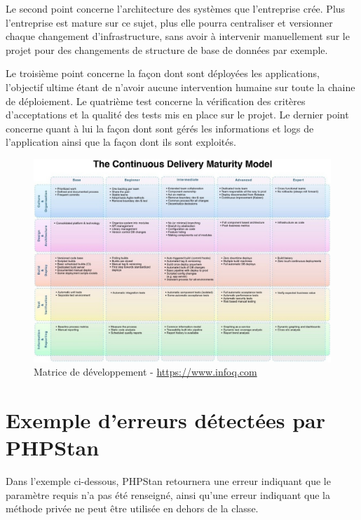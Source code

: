 Le second point concerne l'architecture des systèmes que l'entreprise crée. Plus l'entreprise est mature sur ce sujet, plus elle pourra centraliser et versionner chaque changement d'infrastructure, sans avoir à intervenir manuellement sur le projet pour des changements de structure de base de données par exemple.

Le troisième point concerne la façon dont sont déployées les applications, l'objectif ultime étant de n'avoir aucune intervention humaine sur toute la chaine de déploiement. Le quatrième test concerne la vérification des critères d'acceptations et la qualité des tests mis en place sur le projet. Le dernier point concerne quant à lui la façon dont sont gérés les informations et logs de l'application ainsi que la façon dont ils sont exploités.

\begin{figure}[ht]
	\centering
	\includegraphics[scale=0.62,angle=-90]{img/devops-matrice.jpg}
	\caption{Matrice de développement \devops - \url{https://www.infoq.com}}
	\label{annexe:devops-matriceImage}
\end{figure}

\clearpage
\section{Exemple d'erreurs détectées par PHPStan}\label{annexe:php-error}

Dans l'exemple ci-dessous, PHPStan retournera une erreur indiquant que le paramètre requis  n'a pas été renseigné, ainsi qu'une erreur indiquant que la méthode privée  ne peut être utilisée en dehors de la classe. 

